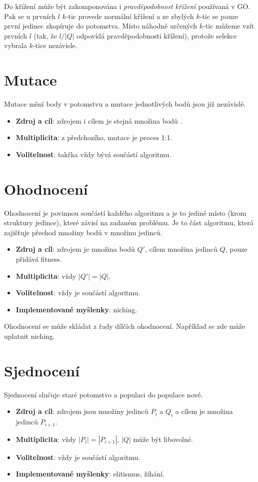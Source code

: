 Do křížení může být zakomponována i \emph{pravděpodobnost křížení} používaná v GO. Pak se u prvních $l$ $k$-tic provede normální křížení a ze zbylých $k$-tic se pouze první jedinec zkopíruje do potomstva. Místo náhodně určených $k$-tic můžeme vzít prvních $l$ (tak, že $l/|Q|$ odpovídá pravděpodobnosti křížení), protože selekce vybrala $k$-tice nezávisle.

\section{Mutace}

Mutace mění body v potomstvu a mutace jednotlivých bodů jsou již nezávislé.
\begin{itemize}
  \item \textbf{Zdroj a cíl}: zdrojem i cílem je stejná množina bodů .
  \item \textbf{Multiplicita}: z předchozího, mutace je proces 1:1.
  \item \textbf{Volitelnost}: takřka vždy bývá součástí algoritmu.
\end{itemize}

\section{Ohodnocení}

Ohodnocení je povinnou součástí každého algoritmu a je to jediné místo (krom struktury jedince), které závisí na zadaném problému. Je to část algoritmu, která zajišťuje přechod množiny bodů v množinu jedinců.
\begin{itemize}
  \item \textbf{Zdroj a cíl}: zdrojem je množina bodů $Q'$, cílem množina jedinců $Q$, pouze přidává fitness.
  \item \textbf{Multiplicita}: vždy $|Q'| = |Q|$.
  \item \textbf{Volitelnost}: vždy je součástí algoritmu.
  \item \textbf{Implementované myšlenky}: niching.
\end{itemize}

Ohodnocení se může skládat z řady dílčích ohodnocení. Například se zde může uplatnit niching.

\section{Sjednocení}

Sjednocení slučuje staré potomstvo a populaci do populace nové.
\begin{itemize}
  \item \textbf{Zdroj a cíl}: zdrojem jsou množiny jedinců $P_i$ a $Q_i$ a cílem je množina jedinců $P_{i+1}$.
  \item \textbf{Multiplicita}: vždy $|P_i| = |P_{i+1}|$, $|Q|$ může být libovolné.
  \item \textbf{Volitelnost}: vždy je součástí algoritmu.
  \item \textbf{Implementované myšlenky}: elitismus, žíhání.
\end{itemize}


